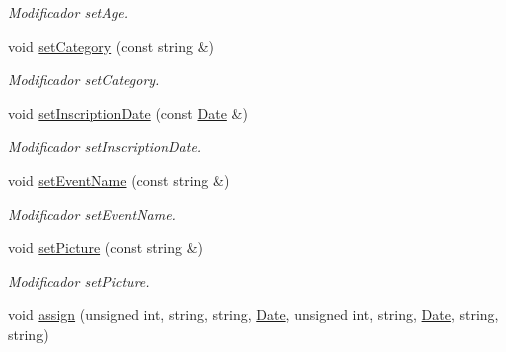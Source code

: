 \begin{DoxyCompactItemize}
\begin{DoxyCompactList}\small\item\em Modificador set\+Age. \end{DoxyCompactList}\item 
void \hyperlink{class_participant_a42bf4d1082274e44657829fc2aa83f11}{set\+Category} (const string \&)\hypertarget{class_participant_a42bf4d1082274e44657829fc2aa83f11}{}\label{class_participant_a42bf4d1082274e44657829fc2aa83f11}

\begin{DoxyCompactList}\small\item\em Modificador set\+Category. \end{DoxyCompactList}\item 
void \hyperlink{class_participant_a1ae8d99347f3690e3e7f50392a0674b2}{set\+Inscription\+Date} (const \hyperlink{class_date}{Date} \&)\hypertarget{class_participant_a1ae8d99347f3690e3e7f50392a0674b2}{}\label{class_participant_a1ae8d99347f3690e3e7f50392a0674b2}

\begin{DoxyCompactList}\small\item\em Modificador set\+Inscription\+Date. \end{DoxyCompactList}\item 
void \hyperlink{class_participant_afdba140f41d1328ee8ee9ae32a710c85}{set\+Event\+Name} (const string \&)\hypertarget{class_participant_afdba140f41d1328ee8ee9ae32a710c85}{}\label{class_participant_afdba140f41d1328ee8ee9ae32a710c85}

\begin{DoxyCompactList}\small\item\em Modificador set\+Event\+Name. \end{DoxyCompactList}\item 
void \hyperlink{class_participant_a99a298d23801e7080efd59c514711b22}{set\+Picture} (const string \&)\hypertarget{class_participant_a99a298d23801e7080efd59c514711b22}{}\label{class_participant_a99a298d23801e7080efd59c514711b22}

\begin{DoxyCompactList}\small\item\em Modificador set\+Picture. \end{DoxyCompactList}\item 
void \hyperlink{class_participant_a1d365d9818206db0f4fa07a34179b13c}{assign} (unsigned int, string, string, \hyperlink{class_date}{Date}, unsigned int, string, \hyperlink{class_date}{Date}, string, string)\hypertarget{class_participant_a1d365d9818206db0f4fa07a34179b13c}{}\label{class_participant_a1d365d9818206db0f4fa07a34179b13c}


\end{DoxyCompactItemize}
